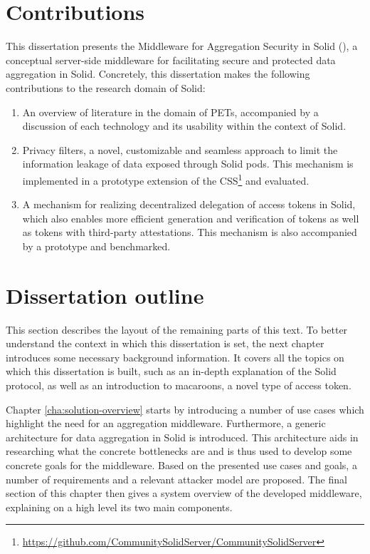 \section{Contributions}
\label{sec:contributions}
This dissertation presents the Middleware for Aggregation Security in Solid (\middleware{}), a conceptual server-side middleware for facilitating secure and protected data aggregation in Solid. Concretely, this dissertation makes the following contributions to the research domain of Solid:
\begin{enumerate}
    \item An overview of literature in the domain of \acrfull{PETs}, accompanied by a discussion of each technology and its usability within the context of Solid.
    \newpage
    \item Privacy filters, a novel, customizable and seamless approach to limit the information leakage of data exposed through Solid pods. This mechanism is implemented in a prototype extension of the \acrlong{CSS}\footnote{\url{https://github.com/CommunitySolidServer/CommunitySolidServer}} and evaluated.
    \item A mechanism for realizing decentralized delegation of access tokens in Solid, which also enables more efficient generation and verification of tokens as well as tokens with third-party attestations. This mechanism is also accompanied by a prototype and benchmarked.
\end{enumerate}

\section{Dissertation outline}
\label{sec:outline}
This section describes the layout of the remaining parts of this text. To better understand the context in which this dissertation is set, the next chapter introduces some necessary background information. It covers all the topics on which this dissertation is built, such as an in-depth explanation of the Solid protocol, as well as an introduction to macaroons, a novel type of access token. 

Chapter \ref{cha:solution-overview} starts by introducing a number of use cases which highlight the need for an aggregation middleware. Furthermore, a generic architecture for data aggregation in Solid is introduced. This architecture aids in researching what the concrete bottlenecks are and is thus used to develop some concrete goals for the middleware. Based on the presented use cases and goals, a number of requirements and a relevant attacker model are proposed. The final section of this chapter then gives a system overview of the developed middleware, explaining on a high level its two main components.

